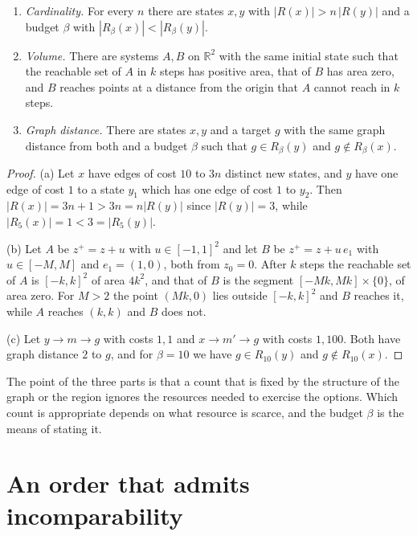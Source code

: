 \begin{newresult}\label{prop:separations}
\begin{enumerate}[nosep,label=(\alph*)]
  \item \emph{Cardinality.} For every $n$ there are states $x,y$ with $|R(x)|>n\,|R(y)|$ and a budget $\beta$ with $|R_\beta(x)|<|R_\beta(y)|$.
  \item \emph{Volume.} There are systems $A,B$ on $\mathbb R^2$ with the same initial state such that the reachable set of $A$ in $k$ steps has positive area, that of $B$ has area zero, and $B$ reaches points at a distance from the origin that $A$ cannot reach in $k$ steps.
  \item \emph{Graph distance.} There are states $x,y$ and a target $g$ with the same graph distance from both and a budget $\beta$ such that $g\in R_\beta(y)$ and $g\notin R_\beta(x)$.
\end{enumerate}
\end{newresult}
\begin{proof}
(a) Let $x$ have edges of cost $10$ to $3n$ distinct new states, and $y$ have one edge of cost $1$ to a state $y_1$ which has one edge of cost $1$ to $y_2$. Then $|R(x)|=3n+1>3n=n|R(y)|$ since $|R(y)|=3$, while $|R_5(x)|=1<3=|R_5(y)|$.

(b) Let $A$ be $z^{+}=z+u$ with $u\in[-1,1]^2$ and let $B$ be $z^{+}=z+u\,e_1$ with $u\in[-M,M]$ and $e_1=(1,0)$, both from $z_0=0$. After $k$ steps the reachable set of $A$ is $[-k,k]^2$ of area $4k^2$, and that of $B$ is the segment $[-Mk,Mk]\times\{0\}$, of area zero. For $M>2$ the point $(Mk,0)$ lies outside $[-k,k]^2$ and $B$ reaches it, while $A$ reaches $(k,k)$ and $B$ does not.

(c) Let $y\to m\to g$ with costs $1,1$ and $x\to m'\to g$ with costs $1,100$. Both have graph distance $2$ to $g$, and for $\beta=10$ we have $g\in R_{10}(y)$ and $g\notin R_{10}(x)$.
\end{proof}

The point of the three parts is that a count that is fixed by the structure of the graph or the region ignores the resources needed to exercise the options. Which count is appropriate depends on what resource is scarce, and the budget $\beta$ is the means of stating it.

\section{An order that admits incomparability}

